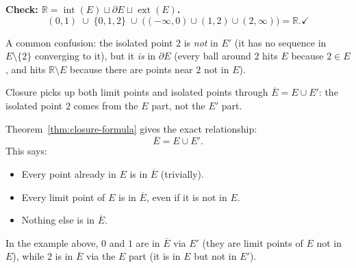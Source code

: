 \begin{example}[Computing $E'$, $\overline{E}$, $\partial E$, $\operatorname{int}(E)$,
$\operatorname{ext}(E)$ for $E = (0,1) \cup \{2\}$ in $\mathbb{R}$]
\noindent\textbf{Check: $\mathbb{R} = \operatorname{int}(E) \sqcup \partial E \sqcup \operatorname{ext}(E)$.}
\[
(0,1) \;\cup\; \{0,1,2\} \;\cup\; \bigl((-\infty,0)\cup(1,2)\cup(2,\infty)\bigr)
= \mathbb{R}. \checkmark
\]
\end{example}

\begin{remark*}
A common confusion: the isolated point $2$ is \emph{not} in $E'$ (it has no
sequence in $E \setminus \{2\}$ converging to it), but it \emph{is} in $\partial E$
(every ball around $2$ hits $E$ because $2 \in E$, and hits $\mathbb{R} \setminus E$
because there are points near $2$ not in $E$).

Closure picks up both limit points and isolated points through $\overline{E} = E \cup E'$:
the isolated point $2$ comes from the $E$ part, not the $E'$ part.
\end{remark*}

\begin{remark*}
Theorem~\ref{thm:closure-formula} gives the exact relationship:
\[
\overline{E} = E \cup E'.
\]
This says:
\begin{itemize}
  \item Every point already in $E$ is in $\overline{E}$ (trivially).
  \item Every limit point of $E$ is in $\overline{E}$, even if it is not in $E$.
  \item Nothing else is in $\overline{E}$.
\end{itemize}
In the example above, $0$ and $1$ are in $\overline{E}$ via $E'$
(they are limit points of $E$ not in $E$), while $2$ is in $\overline{E}$
via the $E$ part (it is in $E$ but not in $E'$).
\end{remark*}
